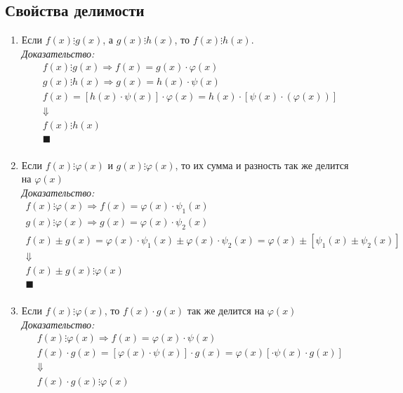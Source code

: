 \documentclass[12pt, fleqn]{article}
\begin{document}
\subsection*{Свойства делимости}
\begin{enumerate}
	\item Если $f(x)\vdots g(x)$, а $g(x) \vdots h(x)$, то $f(x) \vdots h(x)$.\\
	\textit{Доказательство:}
	\begin{multline*}
		f(x)\vdots g(x) \Rightarrow f(x) = g(x)\cdot \varphi(x)\\
		g(x) \vdots h(x) \Rightarrow g(x) = h(x)\cdot \psi(x)\\
		f(x) = \left[h(x)\cdot\psi(x)\right]\cdot\varphi(x)=h(x)\cdot\left[\psi(x)\cdot(\varphi(x))\right]\\
		\Downarrow\\
		f(x)\vdots h(x)\\
		\blacksquare\\
	\end{multline*}
	\item Если $f(x)\vdots\varphi(x)$ и $g(x)\vdots\varphi(x)$, то их сумма и разность так же делится на $\varphi(x)$\\
		\textit{Доказательство:}
		\begin{multline*}
			f(x)\vdots \varphi(x) \Rightarrow f(x) = \varphi(x)\cdot\psi_1(x)\\
			g(x) \vdots \varphi(x) \Rightarrow g(x) = \varphi(x)\cdot \psi_2(x)\\
			f(x)\pm g(x) = \varphi(x)\cdot\psi_1(x) \pm \varphi(x)\cdot\psi_2(x)=\varphi(x)\pm\left[\psi_1(x)\pm\psi_2(x)\right]\\
			\Downarrow\\
			f(x)\pm g(x)\vdots \varphi(x)\\
			\blacksquare\\
		\end{multline*}
	\item Если $f(x)\vdots\varphi(x)$, то $f(x)\cdot g(x)$ так же делится на $\varphi(x)$\\
	\textit{Доказательство:}
	\begin{multline*}
		f(x)\vdots \varphi(x) \Rightarrow f(x) = \varphi(x)\cdot\psi(x)\\
		f(x)\cdot g(x) = \left[\varphi(x)\cdot\psi(x)\right]\cdot g(x)=\varphi(x)\left[\cdot\psi(x)\cdot g(x)\right]\\
		\Downarrow\\
		f(x)\cdot g(x)\vdots \varphi(x)\\

\end{multline*}
\end{enumerate}
\end{document}
